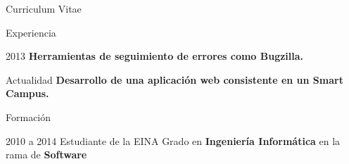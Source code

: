 \documentclass[letterpaper,12pt]{article}
\begin{document}
\begin{cv}{Curriculum Vitae}
\begin{cvlist}{Experiencia}
	\item[2013] \textbf{Herramientas de seguimiento de errores como Bugzilla.}\\	
	
	\item[Actualidad] \textbf{Desarrollo de una aplicación web consistente en un Smart Campus.}\\


\end{cvlist}

\begin{cvlist}{Formación}

	\item[2010 a 2014] Estudiante de la EINA
		Grado en \textbf{Ingeniería Informática} en la rama de \textbf{Software}\\


\end{cvlist}

\end{cv}
\end{document}
